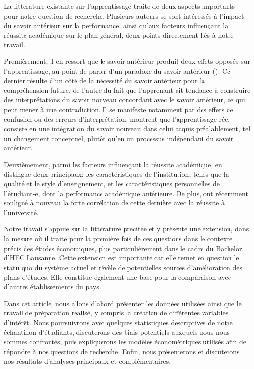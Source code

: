 La littérature existante sur l'apprentissage traite de deux aspects importants pour notre question de recherche. Plusieurs auteurs se sont intéressés à l’impact du savoir antérieur sur la performance, ainsi qu’aux facteurs influençant la réussite académique sur le plan général, deux points directement liés à notre travail.

Premièrement, il en ressort que le savoir antérieur produit deux effets opposés sur l’apprentissage, au point de parler d’un paradoxe du savoir antérieur (\cite{roschelle}). Ce dernier résulte d’un côté de la nécessité du savoir antérieur pour la compréhension future, de l’autre du fait que l’apprenant ait tendance à construire des interprétations du savoir nouveau concordant avec le savoir antérieur, ce qui peut mener à une contradiction. Il se manifeste notamment par des effets de confusion ou des erreurs d’interprétation. \cite{champagne} montrent que l’apprentissage réel consiste en une intégration du savoir nouveau dans celui acquis préalablement, tel un changement conceptuel, plutôt qu'en un processus indépendant du savoir antérieur.

Deuxièmement, parmi les facteurs influençant la réussite académique, \cite{touron} en distingue deux principaux: les caractéristiques de l'institution, telles que la qualité et le style d'enseignement, et les caractéristiques personnelles de l’étudiant-e, dont la performance académique antérieure. De plus, \cite{garcia} ont récemment souligné à nouveau la forte corrélation de cette dernière avec la réussite à l'université.

Notre travail s'appuie sur la littérature précitée et y présente une extension, dans la mesure où il traite pour la première fois de ces questions dans le contexte précis des études économiques, plus particulièrement dans le cadre du Bachelor d'HEC Lausanne. Cette extension est importante car elle remet en question le statu quo du système actuel et révèle de potentielles sources d’amélioration des plans d’études. Elle constitue également une base pour la comparaison avec d’autres établissements du pays.


Dans cet article, nous allons d'abord présenter les données utilisées ainsi que le travail de préparation réalisé, y compris la création de différentes variables d'intérêt. Nous poursuivrons avec quelques statistiques descriptives de notre échantillon d'étudiants, discuterons des biais potentiels auxquels nous nous sommes confrontés, puis expliquerons les modèles économétriques utilisés afin de répondre à nos questions de recherche. Enfin, nous présenterons et discuterons nos résultats d'analyses principaux et complémentaires.
